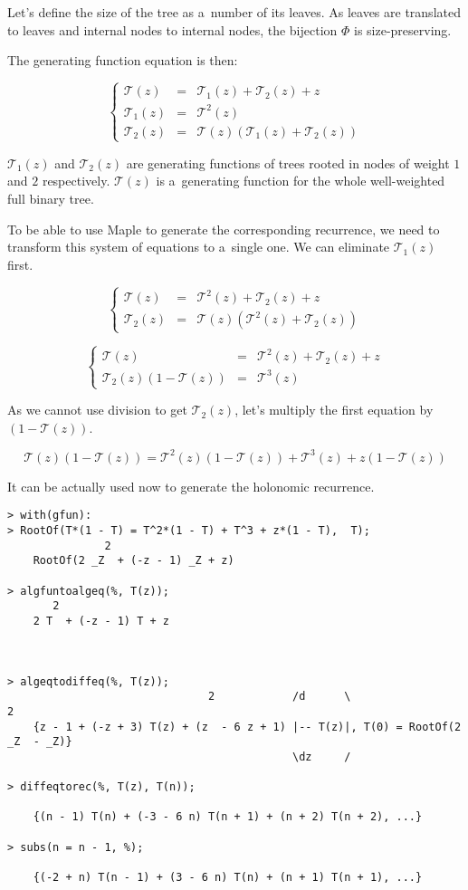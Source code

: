 \documentclass[final]{article}
\theoremstyle{definition}
\theoremstyle{definition}
\theoremstyle{remark}
\newcommand{\gf}[1]{\ensuremath{\mathcal{#1}}}
\begin{document}
Let's define the size of the tree as a~number of its leaves. As leaves are translated to leaves and internal nodes to internal nodes, the bijection \(\Phi\) is size-preserving.

The generating function equation is then:

\[\left\{\begin{array}{rcl}
            \gf{T}(z) &=& \gf{T}_1(z) + \gf{T}_2(z) + z\\
            \gf{T}_1(z) &=& \gf{T}^2(z)\\
            \gf{T}_2(z) &=& \gf{T}(z)(\gf{T}_1(z) + \gf{T}_2(z))
\end{array}\right.\]

\(\gf{T}_1(z)\) and \(\gf{T}_2(z)\) are generating functions of trees rooted in nodes of weight \(1\) and \(2\) respectively. \(\gf{T}(z)\) is a~generating function for the whole well-weighted full binary tree.

To be able to use Maple to generate the corresponding recurrence, we need to transform this system of equations to a~single one. We can eliminate \(\gf{T}_1(z)\) first.

\[\left\{\begin{array}{rcl}
            \gf{T}(z) &=& \gf{T}^2(z) + \gf{T}_2(z) + z\\
            \gf{T}_2(z) &=& \gf{T}(z)(\gf{T}^2(z) + \gf{T}_2(z))
\end{array}\right.\]

\[\left\{\begin{array}{rcl}
            \gf{T}(z) &=& \gf{T}^2(z) + \gf{T}_2(z) + z\\
            \gf{T}_2(z)(1 - \gf{T}(z)) &=& \gf{T}^3(z)
\end{array}\right.\]

As we cannot use division to get \(\gf{T}_2(z)\), let's multiply the first equation by \((1 - \gf{T}(z))\).

\[\gf{T}(z)(1 - \gf{T}(z)) = \gf{T}^2(z)(1 - \gf{T}(z)) + \gf{T}^3(z) + z(1 - \gf{T}(z))\]

It can be actually used now to generate the holonomic recurrence.

\begin{lstlisting}
> with(gfun):
> RootOf(T*(1 - T) = T^2*(1 - T) + T^3 + z*(1 - T),  T);
               2
    RootOf(2 _Z  + (-z - 1) _Z + z)

> algfuntoalgeq(%, T(z));
       2
    2 T  + (-z - 1) T + z



> algeqtodiffeq(%, T(z));
                               2            /d      \                   2
    {z - 1 + (-z + 3) T(z) + (z  - 6 z + 1) |-- T(z)|, T(0) = RootOf(2 _Z  - _Z)}
                                            \dz     /

> diffeqtorec(%, T(z), T(n));

    {(n - 1) T(n) + (-3 - 6 n) T(n + 1) + (n + 2) T(n + 2), ...}

> subs(n = n - 1, %);

    {(-2 + n) T(n - 1) + (3 - 6 n) T(n) + (n + 1) T(n + 1), ...}
\end{lstlisting}
\end{document}

